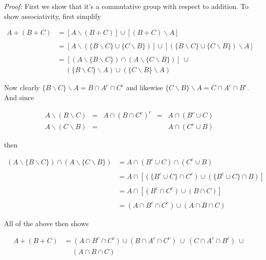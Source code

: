 \documentclass{article}
\begin{document}
  {\it Proof:} First we show that it's a commutative group with respect to addition.  To show associativity, first simplify

  \begin{align*}
    A+(B+C) &= [A\smallsetminus (B+C)] \cup [(B+C)\smallsetminus A] \\\\
    &= [A\smallsetminus (\{B\smallsetminus C\}\cup \{C\smallsetminus B\})] \cup [(\{B\smallsetminus C\}\cup \{C\smallsetminus B\}) \smallsetminus A] \\\\
    &= [(A\smallsetminus \{B\smallsetminus C\})\cap (A\smallsetminus \{C\smallsetminus B\})] \ \cup\\
    &\quad \ (\{B\smallsetminus C\}\smallsetminus A) \cup (\{C\smallsetminus B\}\smallsetminus A)
  \end{align*}

  Now clearly $\{B\smallsetminus C\}\smallsetminus A = B\cap A^c\cap C^c$ and likewise $\{C\smallsetminus B\}\smallsetminus A = C\cap A^c\cap B^c$.  And since

  \begin{align*}
    A\smallsetminus (B\smallsetminus C) &=& A\cap (B\cap C^c)^c &=& A\cap (B^c\cup C) \\
    A\smallsetminus (C\smallsetminus B) &=& && A\cap (C^c\cup B)
  \end{align*}

  then

  \begin{align*}
    (A\smallsetminus \{B\smallsetminus C\})\cap (A\smallsetminus \{C\smallsetminus B\}) &= A\cap (B^c\cup C)\cap (C^c\cup B) \\\\
    &= A\cap [(\{B^c\cup C\}\cap C^c) \cup (\{B^c\cup C\}\cap B)] \\\\
    &= A\cap [(B^c\cap C^c)\cup (B\cap C)] \\\\
    &= (A\cap B^c\cap C^c)\cup (A\cap B\cap C)
  \end{align*}

  All of the above then shows

  \begin{align*}
    A+(B+C) &= (A\cap B^c\cap C^c) \cup (B\cap A^c\cap C^c) \ \cup \ (C\cap A^c\cap B^c) \ \cup \\
    & \quad \ (A\cap B\cap C)
  \end{align*}
\end{document}
